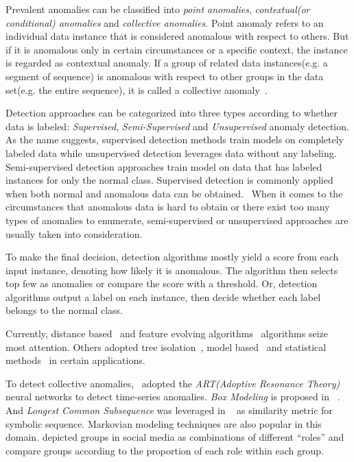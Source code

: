 \documentclass[10pt,conference,letterpaper]{IEEEtran}
\begin{document}
			Prevalent anomalies can be classified into \textit{point anomalies}, \textit{contextual(or conditional) anomalies} and \textit{collective anomalies}. Point anomaly refers to an individual data instance that is considered anomalous with respect to others. But if it is anomalous only in certain circumstances or a specific context, the instance is regarded as contextual anomaly. If a group of related data instances(e.g. a segment of sequence) is anomalous with respect to other groups in the data set(e.g. the entire sequence), it is called a collective anomaly~\cite{goldberger2000components}.
			
			Detection approaches can be categorized into three types according to whether data is labeled: \textit{Supervised}, \textit{Semi-Supervised} and \textit{Unsupervised} anomaly detection. As the name suggests, supervised detection methods train models on completely labeled data while unsupervised detection leverages data without any labeling. Semi-supervised detection approaches train model on data that has labeled instances for only the normal class. Supervised detection is commonly applied when both normal and anomalous data can be obtained.~\cite{fujimaki2005approach} When it comes to the circumstances that anomalous data is hard to obtain or there exist too many types of anomalies to enumerate, semi-supervised or unsupervised approaches are usually taken into consideration.
	
			To make the final decision, detection algorithms mostly yield a score from each input instance, denoting how likely it is anomalous. The algorithm then selects top few as anomalies or compare the score with a threshold. Or, detection algorithms output a label on each instance, then decide whether each label belongs to the normal class.
			
			Currently, distance based~\cite{cao2014scalable,cao2017multi} and feature evolving algorithms~\cite{masud2013classification,li2015discovery,shao2014prototype} algorithms seize most attention. Others adopted tree isolation~\cite{zhang2017lshiforest}, model based~\cite{yin2016model} and statistical methods~\cite{zhu2002statstream} in certain applications.
	
			To detect collective anomalies,~\cite{caudell1993adaptive} adopted the \textit{ART(Adoptive Resonance Theory)} neural networks to detect time-series anomalies. \textit{Box Modeling} is proposed in ~\cite{chan2005modeling}. And \textit{Longest Common Subsequence} was leveraged in ~\cite{budalakoti2006anomaly} as similarity metric for symbolic sequence. Markovian modeling techniques are also popular in this domain\cite{ye2000markov,warrender1999detecting,pavlov2003sequence}. \cite{yu2015glad} depicted groups in social media as combinations of different ``roles'' and compare groups according to the proportion of each role within each group.
	
\end{document}
